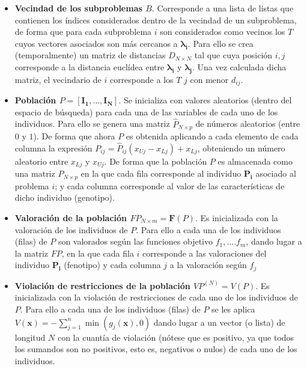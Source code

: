 \begin{itemize}

\item \textbf{Vecindad de los subproblemas $B$}. Corresponde a una lista de listas que contienen los índices considerados dentro de la vecindad de un subproblema, de forma que para cada subproblema $i$ son considerados como vecinos los $T$ cuyos vectores asociados son más cercanos a $\boldsymbol{\lambda_i}$. Para ello se crea (temporalmente) un matriz de distancias $D_{N \times N}$ tal que cuya posición $i,j$ corresponde a la distancia euclídea entre $\boldsymbol{\lambda_i}$ y $\boldsymbol{\lambda_j}$. Una vez calculada dicha matriz, el vecindario de $i$ corresponde a los $T$ $j$ con menor $d_{ij}$.\\

\item \textbf{Población $P = [\boldsymbol{I_1}, \dots, \boldsymbol{I_N}]$}. Se inicializa con valores aleatorios (dentro del espacio de búsqueda) para cada una de las variables de cada uno de los individuos. Para ello se genera una matriz $\hat{P}_{N \times p}$ de números aleatorios (entre $0$ y $1$). De forma que ahora $P$ es obtenida aplicando a cada elemento de cada columna la expresión $P_{ij}=\hat{P}_{ij} \left(x_{Uj} - x_{Lj}\right) + x_{Lj}$, obteniendo un número aleatorio entre $x_{Lj}$ y $x_{Uj}$. De forma que la población $P$ es almacenada como una matriz $P_{N \times p}$ en la que cada fila corresponde al individuo $\boldsymbol{P_i}$ asociado al problema $i$; y cada columna corresponde al valor de las características de dicho individuo (genotipo).\\

\item \textbf{Valoración de la población $FP_{N \times m} = \boldsymbol{F}(P)$}. Es inicializada con la valoración de los individuos de $P$. Para ello a cada una de los individuos (filas) de $P$ son valorados según las funciones objetivo $f_1, \dots. f_m$, dando lugar a la matriz $FP$, en la que cada fila $i$ corresponde a las valoraciones del individuo $\boldsymbol{P_i}$ (fenotipo) y cada columna $j$ a la valoración según $f_j$\\ 

\item \textbf{Violación de restricciones de la población $VP^{(N)} = V(P)$}. Es inicializada con la violación de restricciones de cada uno de los individuos de $P$. Para ello a cada una de los individuos (filas) de $P$ se les aplica $V(\boldsymbol{x})= - \sum \limits_{j=1}^{n} \min(g_j(\boldsymbol{x}), 0)$ dando lugar a un vector (o lista) de longitud $N$ con la cuantía de violación (nótese que es positivo, ya que todos los sumandos son no positivos, esto es, negativos o nulos) de cada uno de los individuos.\\ 


\end{itemize}
